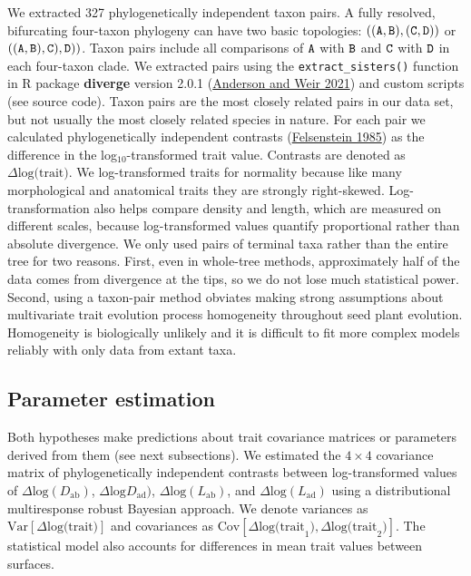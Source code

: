 \documentclass[
  10pt,
]{article}
\begin{document}
We extracted 327 phylogenetically independent taxon pairs. A fully resolved, bifurcating four-taxon phylogeny can have two basic topologies: \(\tt{((A,B),(C,D))}\) or \(\tt{((A,B),C),D))}\). Taxon pairs include all comparisons of \(\tt{A}\) with \(\tt{B}\) and \(\tt{C}\) with \(\tt{D}\) in each four-taxon clade. We extracted pairs using the \texttt{extract\_sisters()} function in R package \textbf{diverge} version 2.0.1 (\protect\hyperlink{ref-anderson_diverge_2021}{Anderson and Weir 2021}) and custom scripts (see source code). Taxon pairs are the most closely related pairs in our data set, but not usually the most closely related species in nature. For each pair we calculated phylogenetically independent contrasts (\protect\hyperlink{ref-felsenstein_phylogenies_1985}{Felsenstein 1985}) as the difference in the log\(_{10}\)-transformed trait value. Contrasts are denoted as \(\Delta \text{log(trait)}\). We log-transformed traits for normality because like many morphological and anatomical traits they are strongly right-skewed. Log-transformation also helps compare density and length, which are measured on different scales, because log-transformed values quantify proportional rather than absolute divergence. We only used pairs of terminal taxa rather than the entire tree for two reasons. First, even in whole-tree methods, approximately half of the data comes from divergence at the tips, so we do not lose much statistical power. Second, using a taxon-pair method obviates making strong assumptions about multivariate trait evolution process homogeneity throughout seed plant evolution. Homogeneity is biologically unlikely and it is difficult to fit more complex models reliably with only data from extant taxa.

\hypertarget{parameter-estimation}{%
\subsection{Parameter estimation}\label{parameter-estimation}}

Both hypotheses make predictions about trait covariance matrices or parameters derived from them (see next subsections). We estimated the \(4 \times 4\) covariance matrix of phylogenetically independent contrasts between log-transformed values of \(\Delta \text{log}(D_\mathrm{ab})\), \(\Delta \text{log}D_\mathrm{ad})\), \(\Delta \text{log}(L_\mathrm{ab})\), and \(\Delta \text{log}(L_\mathrm{ad})\) using a distributional multiresponse robust Bayesian approach. We denote variances as \(\text{Var}[\Delta \text{log(trait)}]\) and covariances as \(\text{Cov}[\Delta \text{log(trait}_1),\Delta \text{log(trait}_2)]\). The statistical model also accounts for differences in mean trait values between surfaces.
\end{document}
